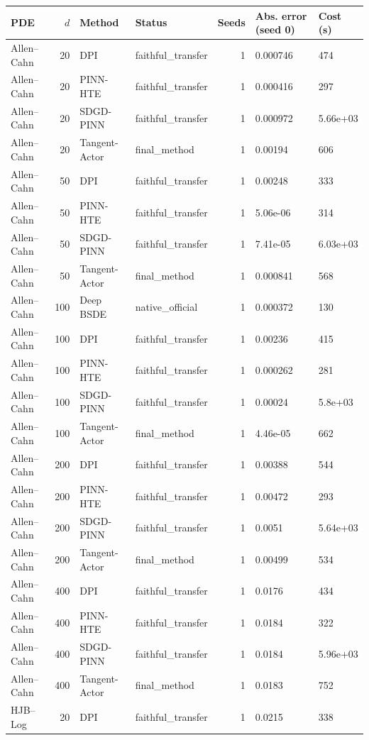 \begin{tabular}{lrllrll}
\toprule
PDE & $d$ & Method & Status & Seeds & Abs. error (seed 0) & Cost (s) \\
\midrule
Allen–Cahn & 20 & DPI & faithful\_transfer & 1 & 0.000746 & 474 \\
Allen–Cahn & 20 & PINN-HTE & faithful\_transfer & 1 & 0.000416 & 297 \\
Allen–Cahn & 20 & SDGD-PINN & faithful\_transfer & 1 & 0.000972 & 5.66e+03 \\
Allen–Cahn & 20 & Tangent-Actor & final\_method & 1 & 0.00194 & 606 \\
Allen–Cahn & 50 & DPI & faithful\_transfer & 1 & 0.00248 & 333 \\
Allen–Cahn & 50 & PINN-HTE & faithful\_transfer & 1 & 5.06e-06 & 314 \\
Allen–Cahn & 50 & SDGD-PINN & faithful\_transfer & 1 & 7.41e-05 & 6.03e+03 \\
Allen–Cahn & 50 & Tangent-Actor & final\_method & 1 & 0.000841 & 568 \\
Allen–Cahn & 100 & Deep BSDE & native\_official & 1 & 0.000372 & 130 \\
Allen–Cahn & 100 & DPI & faithful\_transfer & 1 & 0.00236 & 415 \\
Allen–Cahn & 100 & PINN-HTE & faithful\_transfer & 1 & 0.000262 & 281 \\
Allen–Cahn & 100 & SDGD-PINN & faithful\_transfer & 1 & 0.00024 & 5.8e+03 \\
Allen–Cahn & 100 & Tangent-Actor & final\_method & 1 & 4.46e-05 & 662 \\
Allen–Cahn & 200 & DPI & faithful\_transfer & 1 & 0.00388 & 544 \\
Allen–Cahn & 200 & PINN-HTE & faithful\_transfer & 1 & 0.00472 & 293 \\
Allen–Cahn & 200 & SDGD-PINN & faithful\_transfer & 1 & 0.0051 & 5.64e+03 \\
Allen–Cahn & 200 & Tangent-Actor & final\_method & 1 & 0.00499 & 534 \\
Allen–Cahn & 400 & DPI & faithful\_transfer & 1 & 0.0176 & 434 \\
Allen–Cahn & 400 & PINN-HTE & faithful\_transfer & 1 & 0.0184 & 322 \\
Allen–Cahn & 400 & SDGD-PINN & faithful\_transfer & 1 & 0.0184 & 5.96e+03 \\
Allen–Cahn & 400 & Tangent-Actor & final\_method & 1 & 0.0183 & 752 \\
HJB–Log & 20 & DPI & faithful\_transfer & 1 & 0.0215 & 338 \\

\end{tabular}
